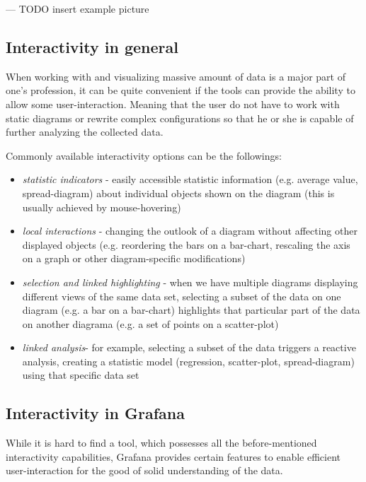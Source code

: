 \begin{center}
	--- TODO insert example picture
\end{center}

\subsection{Interactivity in general}
When working with and visualizing massive amount of data is a major part of one's profession, it can be quite convenient if the tools can provide the ability to allow some user-interaction. Meaning that the user do not have to work with static diagrams or rewrite complex configurations so that he or she is capable of further analyzing the collected data.

Commonly available interactivity options can be the followings:
\begin{itemize}
	\item \emph{statistic indicators} - easily accessible statistic information (e.g. average value, spread-diagram) about individual objects shown on the diagram (this is usually achieved by mouse-hovering)
	\item \emph{local interactions} - changing the outlook of a diagram without affecting other displayed objects (e.g. reordering the bars on a bar-chart, rescaling the axis on a graph or other diagram-specific modifications)
	\item \emph{selection and linked highlighting} - when we have multiple diagrams displaying different views of the same data set, selecting a subset of the data on one diagram (e.g. a bar on a bar-chart) highlights that particular part of the data on another diagrama (e.g. a set of points on a scatter-plot)
	\item \emph{linked analysis}- for example, selecting a subset of the data triggers a reactive analysis, creating a statistic model (regression, scatter-plot, spread-diagram) using that specific data set
\end{itemize}

\subsection{Interactivity in Grafana}

While it is hard to find a tool, which possesses all the before-mentioned interactivity capabilities, Grafana provides certain features to enable efficient user-interaction for the good of solid understanding of the data.


